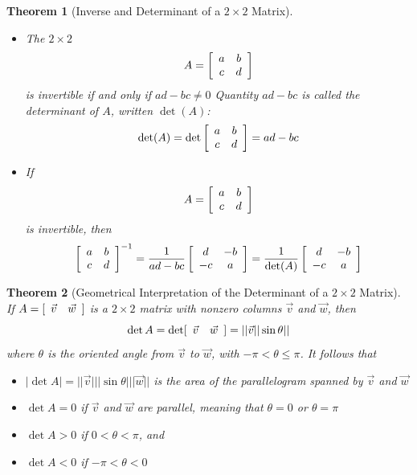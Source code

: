 \documentclass[10pt]{report}
\newtheorem{thm2}{Theorem}[section]
\begin{document}
\begin{thm2}[Inverse and Determinant of a $2\times 2$ Matrix]
\begin{itemize}
\item[a.] The $2\times 2$ 
$$A=\left[\begin{array}{c c}
a & b\\
c & d
\end{array}\right]$$
is invertible if and only if $ad-bc\neq 0$
Quantity $ad-bc$ is called the determinant of $A$, written $\det(A)$:
$$\det(A) = \det \left[ \begin{array}{c c}
a & b\\
c & d
\end{array}\right]=ad-bc$$
\item[b.] If
$$A = \left[ \begin{array}{c c}
a & b\\
c & d
\end{array}\right]$$
is invertible, then
$$\left[ \begin{array}{c c}
a & b\\
c & d
\end{array}\right]^{-1}=\frac{1}{ad-bc}\left[ \begin{array}{c c}
d & -b\\
-c & a
\end{array}\right]= \frac{1}{\det(A)}
\left[ \begin{array}{c c}
d & -b\\
-c & a
\end{array}\right]$$
\end{itemize}
\end{thm2}
\begin{thm2}[Geometrical Interpretation of the Determinant of a $2\times 2$ Matrix]
If $A=[\begin{array}{c c}
\vec{v} & \vec{w}
\end{array}]$ is a  $2\times 2$ matrix with nonzero columns $\vec{v}$ and $\vec{w}$, then
$$\det A = \det [\begin{array}{c c}
\vec{v} & \vec{w}
\end{array}] = ||\vec{v}||\sin \theta||$$
where $\theta$ is the oriented angle from $\vec{v}$ to $\vec{w}$, with $-\pi<\theta \leq \pi$. It follows that
\begin{itemize}
\item $|\det A|=||\vec{v}|| |\sin \theta| ||\vec{w}||$ is the area of the parallelogram spanned by $\vec{v}$ and $\vec{w}$
\item $\det A=0$ if $\vec{v}$ and $\vec{w}$ are parallel, meaning that $\theta=0$ or $\theta = \pi$
\item $\det A >0$ if $0<\theta <\pi$, and
\item $\det A <0$ if $-\pi<\theta <0$
\end{itemize}
\end{thm2}
\end{document}
